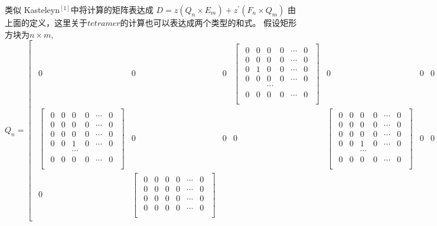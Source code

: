 \documentclass[twoside,a4paper,CCT]{cctart}   %
\begin{document}
类似 Kasteleyn$^{[1]}$中将计算的矩阵表达成
$D=z(Q_{n}\times E_{m})  +  z^{'} (F_{n} \times Q_{m})$
由上面的定义，这里关于$tetramer$的计算也可以表达成两个类型的和式。
假设矩形方块为$n\times m$,
$$
  Q_{n} = \begin{bmatrix}\begin{smallmatrix}
  0& 0& 0&
  \begin{bmatrix}\begin{smallmatrix}
 0& 0& 0&0&\cdots&0\\
 0& 0& 0&0&\cdots&0\\
 0& 1& 0&0&\cdots&0\\
 0& 0& 0&0&\cdots&0\\
 & & \cdots& &\\
0& 0&0& 0&\cdots&0\\
 \end{smallmatrix}\end{bmatrix}& 0& 0& 0& \cdots&\\
 \begin{bmatrix}\begin{smallmatrix}
 0& 0& 0&0&\cdots&0\\
 0& 0& 0&0&\cdots&0\\
 0& 0& 0&0&\cdots&0\\
 0& 0& 1&0&\cdots&0\\
 & & \cdots& &\\
0& 0& 0& 0&\cdots&0\\
 \end{smallmatrix}\end{bmatrix}&
 0& 0& 0&
 \begin{bmatrix}\begin{smallmatrix}
 0& 0& 0&0&\cdots&0\\
 0& 0& 0&0&\cdots&0\\
 0& 0& 0&0&\cdots&0\\
 0& 0& 1&0&\cdots&0\\
 & & \cdots& &\\
0& 0& 0& 0&\cdots&0\\
 \end{smallmatrix}\end{bmatrix}&
 0& 0& \cdots&\\
 0& \begin{bmatrix}\begin{smallmatrix}
  0& 0& 0&0&\cdots&0\\
 0& 0& 0&0&\cdots&0\\
 0& 0& 0&0&\cdots&0\\
 0& 0& 0&0&\cdots&0\\

\end{smallmatrix}
\end{bmatrix}
\end{smallmatrix}
\end{bmatrix}$$
\end{document}
